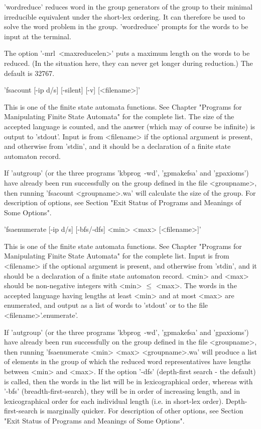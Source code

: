 'wordreduce' reduces word in the group generators of the group to their
minimal irreducible equivalent under the short-lex ordering.
It can therefore be used to solve the word problem in the group.
'wordreduce' prompts for the words to be input at the terminal.

The option '-mrl\ <maxreducelen>' puts a maximum length on the words to
be reduced. (In the situation here, they can never get longer during reduction.)
The default is 32767.

'fsacount  [-ip d/s] [-silent] [-v] [<filename>]'

This is one of the finite state automata functions. See Chapter
"Programs for Manipulating Finite State Automata" for the complete list.
The size of the accepted language is counted, and the answer (which may
of course be infinite) is output to 'stdout'. Input is from <filename> if
the optional argument is present, and otherwise from 'stdin', and it
should be a declaration of a finite state automaton record.

If 'autgroup' (or the three programs 'kbprog\ -wd', 'gpmakefsa'
and 'gpaxioms') have already been run successfully on the group defined
in the file <groupname>, then running 'fsacount <groupname>.wa'
will calculate the size of the group.
For description of options, see Section
"Exit Status of Programs and Meanings of Some Options".


'fsaenumerate  [-ip d/s] [-bfs/-dfs] <min> <max> [<filename>]'

This is one of the finite state automata functions. See Chapter
"Programs for Manipulating Finite State Automata" for the complete list.
Input is from <filename> if
the optional argument is present, and otherwise from 'stdin', and it
should be a declaration of a finite state automaton record.
<min> and <max> should be non-negative integers with <min> $\le$ <max>.
The words in the accepted language having lengths at least <min> and at
most <max> are enumerated, and output as a list of words to 'stdout'
or to the file <filename>'.enumerate'.

If 'autgroup' (or the three programs 'kbprog\ -wd', 'gpmakefsa'
and 'gpaxioms') have already been run successfully on the group defined
in the file <groupname>,
then running 'fsaenumerate <min> <max> <groupname>.wa'
will produce a list of elements in the group of which the reduced
word representatives have lengths between <min> and <max>.
If the option '-dfs' (depth-first search - the default) is called,
then the words
in the list will be in lexicographical order, whereas with '-bfs'
(breadth-first-search), they will be in order of increasing length, and in
lexicographical order for each individual length (i.e. in short-lex order).
Depth-first-search is marginally quicker.
For description of other options, see Section
"Exit Status of Programs and Meanings of Some Options".

